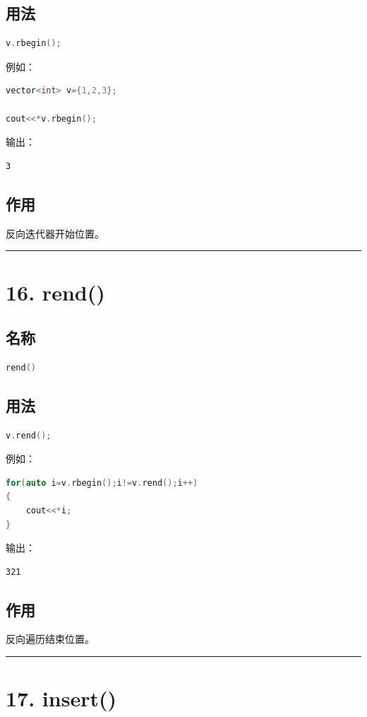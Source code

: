 \documentclass[10pt,twocolumn]{extarticle}
\begin{document}
\subsection{用法}
\begin{lstlisting}[language=C++]
v.rbegin();
\end{lstlisting}
例如：
\begin{lstlisting}[language=C++]
vector<int> v={1,2,3};

cout<<*v.rbegin();
\end{lstlisting}
输出：
\begin{lstlisting}
3
\end{lstlisting}

\subsection{作用}
反向迭代器开始位置。

\noindent\rule{\linewidth}{0.4pt}

\section{16. rend()}

\subsection{名称}
\begin{lstlisting}[language=C++]
rend()
\end{lstlisting}

\subsection{用法}
\begin{lstlisting}[language=C++]
v.rend();
\end{lstlisting}
例如：
\begin{lstlisting}[language=C++]
for(auto i=v.rbegin();i!=v.rend();i++)
{
    cout<<*i;
}
\end{lstlisting}
输出：
\begin{lstlisting}
321
\end{lstlisting}

\subsection{作用}
反向遍历结束位置。

\noindent\rule{\linewidth}{0.4pt}

\section{17. insert()}
\end{document}

